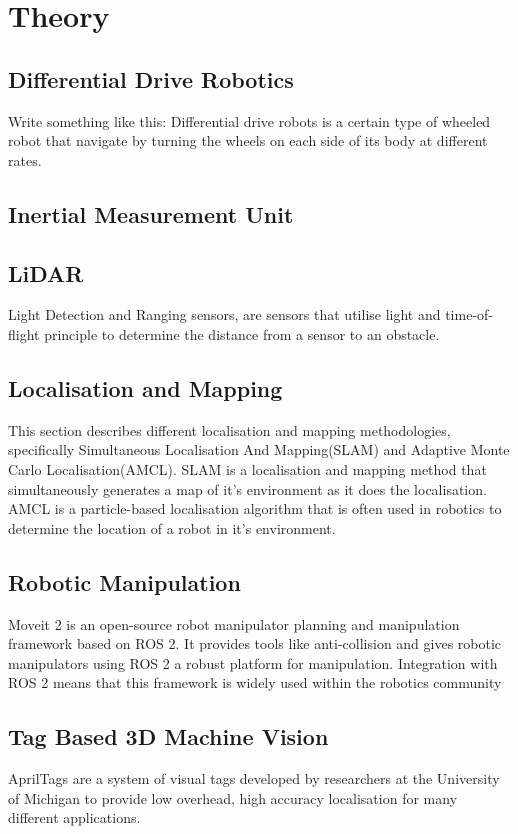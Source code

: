 \chapter{Theory}

\section{Differential Drive Robotics}
Write something like this:
Differential drive robots is a certain type of wheeled robot that navigate by turning the wheels on each side of its body at different rates.

\section{Inertial Measurement Unit}


\section{LiDAR}
Light Detection and Ranging sensors, are sensors that utilise light and time-of-flight principle to determine the distance from a sensor to an obstacle. 

\section{Localisation and Mapping}
This section describes different localisation and mapping methodologies, specifically Simultaneous Localisation And Mapping(SLAM) and Adaptive Monte Carlo Localisation(AMCL). SLAM is a localisation and mapping method that simultaneously generates a map of it's environment as it does the localisation. AMCL is a particle-based localisation algorithm that is often used in robotics to determine the location of a robot in it's environment.

\section{Robotic Manipulation}
Moveit 2 is an open-source robot manipulator planning and manipulation framework based on ROS 2. It provides tools like anti-collision and gives robotic manipulators using  ROS 2 a robust platform for manipulation. Integration with ROS 2 means that this framework is widely used within the robotics community

\section{Tag Based 3D Machine Vision}
AprilTags are a system of visual tags developed by researchers at the University of Michigan to provide low overhead, high accuracy localisation for many different applications. 

